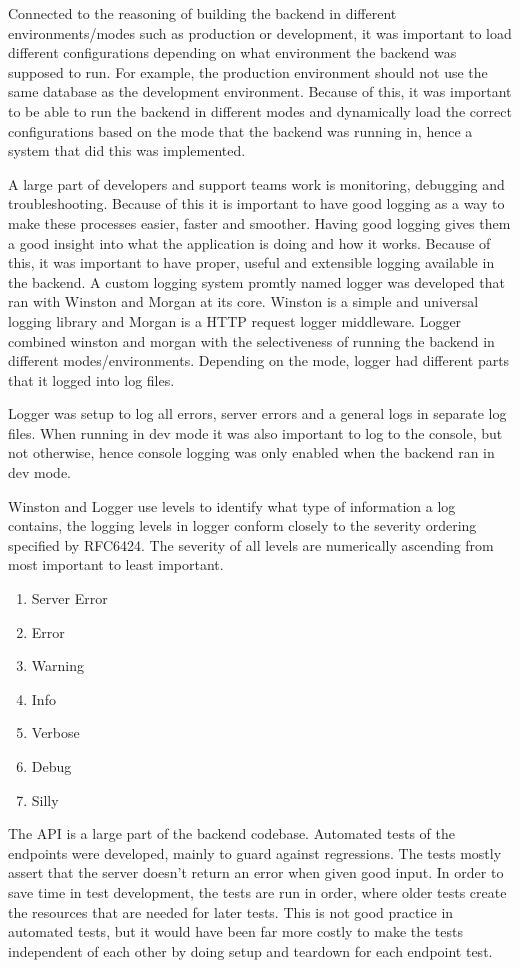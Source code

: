 Connected to the reasoning of building the backend in different environments/modes such as production or development, it was important to load different configurations depending on what environment the backend was supposed to run. For example, the production environment should not use the same database as the development environment. Because of this, it was important to be able to run the backend in different modes and dynamically load the correct configurations based on the mode that the backend was running in, hence a system that did this was implemented.

A large part of developers and support teams work is monitoring, debugging and troubleshooting. Because of this it is important to have good logging as a way to make these processes easier, faster and smoother. Having good logging gives them a good insight into what the application is doing and how it works. Because of this, it was important to have proper, useful and extensible logging available in the backend. A custom logging system promtly named logger was developed that ran with Winston and Morgan at its core. Winston is a simple and universal logging library and Morgan is a HTTP request logger middleware. Logger combined winston and morgan with the selectiveness of running the backend in different modes/environments. Depending on the mode, logger had different parts that it logged into log files.

Logger was setup to log all errors, server errors and a general logs in separate log files. When running in dev mode it was also important to log to the console, but not otherwise, hence console logging was only enabled when the backend ran in dev mode. 

Winston and Logger use levels to identify what type of information a log contains, the logging levels in logger conform closely to the severity ordering specified by RFC6424.
The severity of all levels are numerically ascending from most important to least important.

\begin{enumerate}
  \item Server Error
  \item Error
  \item Warning
  \item Info
  \item Verbose
  \item Debug
  \item Silly
\end{enumerate}

The API is a large part of the backend codebase. Automated tests of the endpoints were developed, mainly to guard against regressions. The tests mostly assert that the server doesn't return an error when given good input. In order to save time in test development, the tests are run in order, where older tests create the resources that are needed for later tests. This is not good practice in automated tests, but it would have been far more costly to make the tests independent of each other by doing setup and teardown for each endpoint test.
